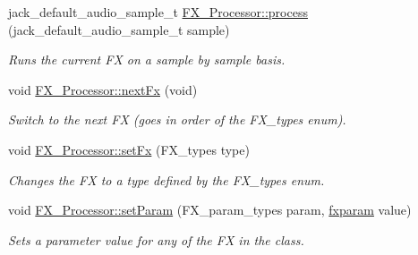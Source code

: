 \begin{DoxyCompactItemize}
jack\+\_\+default\+\_\+audio\+\_\+sample\+\_\+t \hyperlink{group___f_x_ga28c21e02acafee81891aa7a841a9eb2b}{F\+X\+\_\+\+Processor\+::process} (jack\+\_\+default\+\_\+audio\+\_\+sample\+\_\+t sample)
\begin{DoxyCompactList}\small\item\em Runs the current F\+X on a sample by sample basis. \end{DoxyCompactList}\item 
void \hyperlink{group___f_x_ga3db35d06ad4816d43fdee58396a2aa8e}{F\+X\+\_\+\+Processor\+::next\+Fx} (void)
\begin{DoxyCompactList}\small\item\em Switch to the next F\+X (goes in order of the F\+X\+\_\+types enum). \end{DoxyCompactList}\item 
void \hyperlink{group___f_x_ga5e82105e6948cefc5dd0233e55c2afe0}{F\+X\+\_\+\+Processor\+::set\+Fx} (F\+X\+\_\+types type)
\begin{DoxyCompactList}\small\item\em Changes the F\+X to a type defined by the F\+X\+\_\+types enum. \end{DoxyCompactList}\item 
void \hyperlink{group___f_x_ga02c602d1dd654bc0115b2a600bd3937f}{F\+X\+\_\+\+Processor\+::set\+Param} (F\+X\+\_\+param\+\_\+types param, \hyperlink{group___f_x_ga206aa2d2b25bdca17a838a03412b11f7}{fxparam} value)
\begin{DoxyCompactList}\small\item\em Sets a parameter value for any of the F\+X in the class. \end{DoxyCompactList}\end{DoxyCompactItemize}
